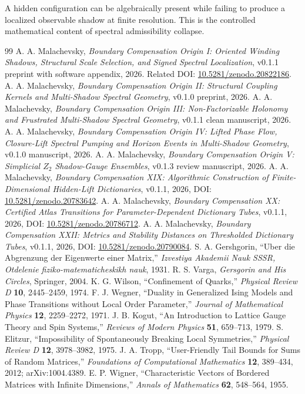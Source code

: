 \documentclass[11pt]{article}
\begin{document}
A hidden configuration can be algebraically present while failing to produce a localized observable shadow at finite resolution. This is the controlled mathematical content of spectral admissibility collapse.

\begin{thebibliography}{99}
 A. A. Malachevsky, \emph{Boundary Compensation Origin I: Oriented Winding Shadows, Structural Scale Selection, and Signed Spectral Localization}, v0.1.1 preprint with software appendix, 2026. Related DOI: \href{https://doi.org/10.5281/zenodo.20822186}{10.5281/zenodo.20822186}.
 A. A. Malachevsky, \emph{Boundary Compensation Origin II: Structural Coupling Kernels and Multi-Shadow Spectral Geometry}, v0.1.0 preprint, 2026.
 A. A. Malachevsky, \emph{Boundary Compensation Origin III: Non-Factorizable Holonomy and Frustrated Multi-Shadow Spectral Geometry}, v0.1.1 clean manuscript, 2026.
 A. A. Malachevsky, \emph{Boundary Compensation Origin IV: Lifted Phase Flow, Closure-Lift Spectral Pumping and Horizon Events in Multi-Shadow Geometry}, v0.1.0 manuscript, 2026.
 A. A. Malachevsky, \emph{Boundary Compensation Origin V: Simplicial $Z_2$ Shadow-Gauge Ensembles}, v0.1.3 review manuscript, 2026.
 A. A. Malachevsky, \emph{Boundary Compensation XIX: Algorithmic Construction of Finite-Dimensional Hidden-Lift Dictionaries}, v0.1.1, 2026, DOI: \href{https://doi.org/10.5281/zenodo.20783642}{10.5281/zenodo.20783642}.
 A. A. Malachevsky, \emph{Boundary Compensation XX: Certified Atlas Transitions for Parameter-Dependent Dictionary Tubes}, v0.1.1, 2026, DOI: \href{https://doi.org/10.5281/zenodo.20786712}{10.5281/zenodo.20786712}.
 A. A. Malachevsky, \emph{Boundary Compensation XXII: Metrics and Stability Distances on Thresholded Dictionary Tubes}, v0.1.1, 2026, DOI: \href{https://doi.org/10.5281/zenodo.20790084}{10.5281/zenodo.20790084}.
 S. A. Gershgorin, ``Uber die Abgrenzung der Eigenwerte einer Matrix,'' \emph{Izvestiya Akademii Nauk SSSR, Otdelenie fiziko-matematicheskikh nauk}, 1931.
 R. S. Varga, \emph{Gersgorin and His Circles}, Springer, 2004.
 K. G. Wilson, ``Confinement of Quarks,'' \emph{Physical Review D} \textbf{10}, 2445--2459, 1974.
 F. J. Wegner, ``Duality in Generalized Ising Models and Phase Transitions without Local Order Parameter,'' \emph{Journal of Mathematical Physics} \textbf{12}, 2259--2272, 1971.
 J. B. Kogut, ``An Introduction to Lattice Gauge Theory and Spin Systems,'' \emph{Reviews of Modern Physics} \textbf{51}, 659--713, 1979.
 S. Elitzur, ``Impossibility of Spontaneously Breaking Local Symmetries,'' \emph{Physical Review D} \textbf{12}, 3978--3982, 1975.
 J. A. Tropp, ``User-Friendly Tail Bounds for Sums of Random Matrices,'' \emph{Foundations of Computational Mathematics} \textbf{12}, 389--434, 2012; arXiv:1004.4389.
 E. P. Wigner, ``Characteristic Vectors of Bordered Matrices with Infinite Dimensions,'' \emph{Annals of Mathematics} \textbf{62}, 548--564, 1955.
\end{thebibliography}
\end{document}
